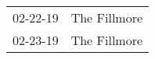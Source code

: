 \begin{supertabular}{p{0.07\textwidth}p{0.23\textwidth}}
 02-22-19 &  The Fillmore \\
 02-23-19 &  The Fillmore \\
\end{supertabular}

